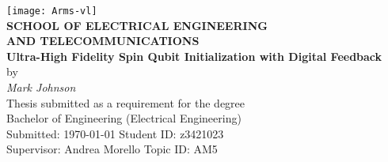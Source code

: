 \begin{center}
	\centering\texttt{[image: Arms-vl]}\\
	[0.5cm]
\textbf{\large SCHOOL OF ELECTRICAL ENGINEERING\\
AND TELECOMMUNICATIONS}\\[2cm]
{\addtolength{\baselineskip}{0.5cm}
\textbf{\Huge
Ultra-High Fidelity Spin Qubit Initialization with Digital Feedback} \\[0.5cm]
}
{\Large by}\\[0.5cm]
\textit{\huge
Mark Johnson} \\[1.5cm]
{\Large
	Thesis submitted as a requirement for the degree\\
	Bachelor of Engineering (Electrical Engineering)\\[2ex]
\vfill
Submitted: \today\hfill
Student ID: z3421023\\[-1.0ex]
Supervisor: Andrea Morello\hfill
Topic ID: AM5\\
\vspace*{-1cm}
}
\end{center}